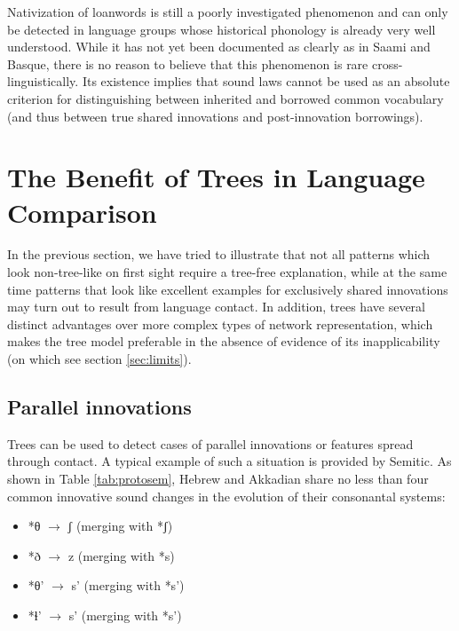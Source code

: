 \documentclass[svgnames,12pt]{scrartcl}
\newcommand{\ipa}[1]{{{\phon\mbox{#1}}}}
\begin{document}
{{Nativization of loanwords is still a poorly investigated phenomenon and can only be detected in
language groups whose historical phonology is already very well understood. While it has not yet
been documented as clearly as in Saami and Basque, there is no reason to believe that this
phenomenon is rare cross-linguistically. Its existence implies that sound laws cannot be used as an absolute criterion for distinguishing between inherited and borrowed common vocabulary (and thus between true shared innovations and post-innovation borrowings).

\section{The Benefit of Trees in Language Comparison}
In the previous section, we have tried to illustrate that not all patterns which look non-tree-like
on first sight require a tree-free explanation, while at the same time patterns that look like
excellent examples for exclusively shared innovations may turn out to result from language
contact.  
In addition, trees have several distinct advantages over more complex types of network
representation, which makes the tree model preferable in the absence of evidence of its inapplicability (on which see section \ref{sec:limits}).

\subsection{Parallel innovations}
Trees can be used to detect cases of parallel innovations or features spread through contact. A
typical example of such a situation is provided by Semitic. As shown in Table \ref{tab:protosem}, Hebrew and Akkadian share no less than four common innovative sound changes in the evolution of their consonantal systems: 
\begin{itemize}
\item \ipa{*θ} $\rightarrow$ \ipa{ʃ} (merging with \ipa{*ʃ})
\item \ipa{*ð} $\rightarrow$ \ipa{z} (merging with \ipa{*s})
\item \ipa{*θ'} $\rightarrow$ \ipa{s'} (merging with \ipa{*s'})
\item \ipa{*ɬ'} $\rightarrow$ \ipa{s'} (merging with \ipa{*s'})
\end{itemize}

}}
\end{document}
